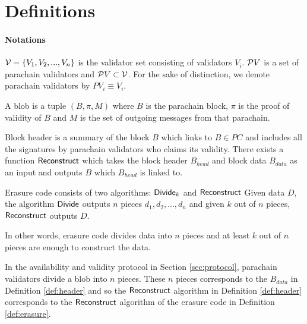 \section{Definitions}

\paragraph{Notations} $\mathcal{V}= \{V_1,V_2,...,V_n\}$ is the validator set consisting of validators $V_i$. $\mathcal{P}V$ is a set of parachain validators and $\mathcal{P}V \subset \mathcal{V}$. For the sake of distinction, we denote parachain validators by $PV_i \equiv V_i$.

\begin{definition}[Blob]
A blob is a tuple $(B, \pi, M)$ where $B$ is the parachain block, $\pi$ is the proof of validity of $B$ and $M$ is the set of outgoing messages from that parachain.
\end{definition}


\begin{definition}\label{def:header}
Block header is a summary of the block $B$ which links to $B\in PC$ and includes all the signatures by parachain validators who claims its validity. There exists a function $\mathsf{Reconstruct}$ which takes the block header $B_{head}$ and block data $B_{data}$ as an input and outputs $B$ which $B_{head}$ is linked to. 
\end{definition}



\begin{definition}\label{def:erasure}
Erasure code consists of two algorithms: $\mathsf{Divide}_k$ and $\mathsf{Reconstruct}$ Given data $D$, the algorithm $\mathsf{Divide}$ outputs $n$ pieces $d_1,d_2,...,d_n$ and given $k$ out of $n$ pieces, $\mathsf{Reconstruct}$ outputs $D$.  

\end{definition}

In other words, erasure code divides data into $n$ pieces and at least $k$ out of $n$ pieces are enough to construct the data.

In the availability and validity protocol in Section \ref{sec:protocol}, parachain validators divide a blob into $n$ pieces. These $n$ pieces corresponds to the $B_{data}$ in Definition \ref{def:header} and so the $\mathsf{Reconstruct}$ algorithm in Definition \ref{def:header}  corresponds to the $\mathsf{Reconstruct}$ algorithm of the erasure code in Definition \ref{def:erasure}.








